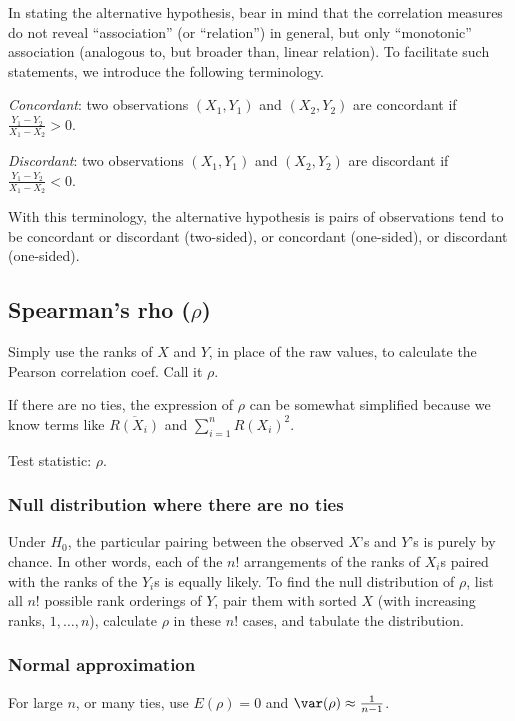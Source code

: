 \documentclass[12pt]{article}
\begin{document}
In stating the alternative hypothesis,
bear in mind that the correlation measures do not reveal ``association''
(or ``relation'') in general,
but only ``monotonic'' association (analogous to, but broader than, linear relation).
To facilitate such statements, we introduce the following terminology.

\emph{Concordant}: two observations $(X_1, Y_1)$ and $(X_2, Y_2)$ are
concordant if $\frac{Y_1 - Y_2}{X_1 - X_2} > 0$.

\emph{Discordant}: two observations $(X_1, Y_1)$ and $(X_2, Y_2)$ are
discordant if $\frac{Y_1 - Y_2}{X_1 - X_2} < 0$.

With this terminology, the alternative hypothesis is
pairs of observations tend to be concordant or discordant (two-sided),
or concordant (one-sided), or discordant (one-sided).

\subsection{Spearman's rho ($\rho$)}

Simply use the ranks of $X$ and $Y$, in place of the raw values,
to calculate the Pearson correlation coef.
Call it $\rho$.

If there are no ties,
the expression of $\rho$ can be somewhat simplified because we know
terms like $\overline{R(X_i)}$ and $\sum_{i=1}^n R(X_i)^2$.

Test statistic: $\rho$.

\subsubsection{Null distribution where there are no ties}

Under $H_0$, the particular pairing between the observed $X$'s and $Y$'s
is purely by chance.
In other words,
each of the $n!$ arrangements of the ranks of $X_i$s paired with the
ranks of the $Y_i$s is equally likely.
To find the null distribution of $\rho$,
list all $n!$ possible rank orderings of $Y$,
pair them with sorted $X$ (with increasing ranks, $1,\dotsc,n$),
calculate $\rho$ in these $n!$ cases,
and tabulate the distribution.

\subsubsection{Normal approximation}

For large $n$, or many ties, use $E(\rho) = 0$
and $\var(\rho) \approx \frac{1}{n-1}$.
\end{document}
